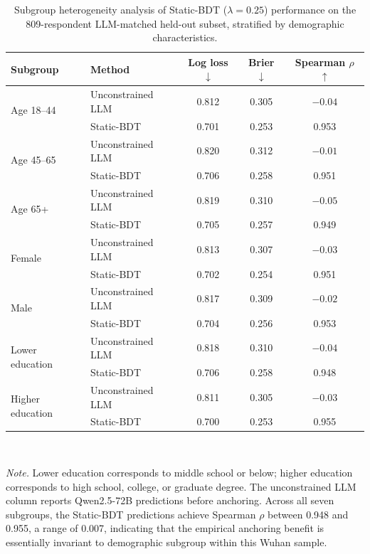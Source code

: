 \documentclass[11pt]{article}
\begin{document}
\begin{table}[h]
\centering
\caption{Subgroup heterogeneity analysis of Static-BDT ($\lambda=0.25$) performance on the 809-respondent LLM-matched held-out subset, stratified by demographic characteristics.}
\label{tab:heterogeneity}
\small
\begin{tabular}{l l c c c}
\toprule
\textbf{Subgroup} & \textbf{Method} & \textbf{Log loss $\downarrow$} & \textbf{Brier $\downarrow$} & \textbf{Spearman $\rho$ $\uparrow$} \\
\midrule
\multirow{2}{*}{Age 18--44} & Unconstrained LLM & 0.812 & 0.305 & $-0.04$ \\
                        & Static-BDT       & 0.701 & 0.253 & 0.953 \\
\midrule
\multirow{2}{*}{Age 45--65} & Unconstrained LLM & 0.820 & 0.312 & $-0.01$ \\
                         & Static-BDT       & 0.706 & 0.258 & 0.951 \\
\midrule
\multirow{2}{*}{Age 65+}  & Unconstrained LLM & 0.819 & 0.310 & $-0.05$ \\
                        & Static-BDT       & 0.705 & 0.257 & 0.949 \\
\midrule
\multirow{2}{*}{Female}    & Unconstrained LLM & 0.813 & 0.307 & $-0.03$ \\
                         & Static-BDT       & 0.702 & 0.254 & 0.951 \\
\midrule
\multirow{2}{*}{Male}      & Unconstrained LLM & 0.817 & 0.309 & $-0.02$ \\
                         & Static-BDT       & 0.704 & 0.256 & 0.953 \\
\midrule
\multirow{2}{*}{Lower education} & Unconstrained LLM & 0.818 & 0.310 & $-0.04$ \\
                                & Static-BDT       & 0.706 & 0.258 & 0.948 \\
\midrule
\multirow{2}{*}{Higher education} & Unconstrained LLM & 0.811 & 0.305 & $-0.03$ \\
                                 & Static-BDT       & 0.700 & 0.253 & 0.955 \\
\bottomrule
\end{tabular}
\\[0.3em]
\begin{minipage}{0.95\textwidth}
\small
\textit{Note.} Lower education corresponds to middle school or below; higher education corresponds to high school, college, or graduate degree. The unconstrained LLM column reports Qwen2.5-72B predictions before anchoring. Across all seven subgroups, the Static-BDT predictions achieve Spearman $\rho$ between 0.948 and 0.955, a range of 0.007, indicating that the empirical anchoring benefit is essentially invariant to demographic subgroup within this Wuhan sample.
\end{minipage}
\end{table}
\end{document}
